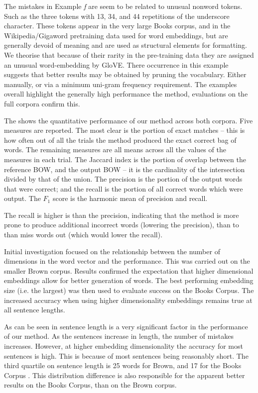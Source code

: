 \documentclass{llncs}
\begin{document}
The mistakes in Example \emph{f} are seem to be related to unusual nonword tokens. Such as the three tokens with 13, 34, and 44 repetitions of the underscore character. These tokens appear in the very large Books corpus, and in the Wikipedia/Gigaword pretraining data used for word embeddings, but are generally devoid of meaning and are used as structural elements for formatting. We theorise that because of their rarity in the pre-training data they are assigned an unusual word-embedding by GloVE. There occurrence in this example suggests that better results may be obtained by pruning the vocabulary. Either manually, or via a minimum uni-gram frequency requirement. The examples overall highlight the generally high performance the method, evaluations on the full corpora confirm this.

The  shows the quantitative performance of our method across both corpora. Five measures are reported. The most clear is the portion of exact matches -- this is how often out of all the trials the method produced the exact correct bag of words. The remaining measures are all means across all the values of the measures in each trial.  The Jaccard index is the portion of overlap between the reference BOW, and the output BOW -- it is the cardinality of the intersection divided by that of the union. The precision is the portion of the output words that were correct; and the recall is the portion of all correct words which were output. The $F_1$ score is the harmonic mean of precision and recall.

The recall is higher is than the precision, indicating that the method is more prone to produce additional incorrect words (lowering the precision), than to than miss words out (which would lower the recall). 

Initial investigation focused on the relationship between the number of dimensions in the word vector and the performance. This was carried out on the smaller Brown corpus. Results confirmed the expectation that higher dimensional embeddings allow for better generation of words. The best performing embedding size (i.e. the largest)  was then used to evaluate success on the Books Corpus. The increased accuracy when using higher dimensionality embeddings remains true at all sentence lengths.

As can be seen in  sentence length is a very significant factor in the performance of our method. As the sentences increase in length, the number of mistakes increases. However, at higher embedding dimensionality the accuracy for most sentences is high. This is because of most sentences being reasonably short. The third quartile on sentence length is 25 words for Brown, and 17 for the Books Corpus . This distribution difference is also responsible for the apparent better results on the Books Corpus, than on the Brown corpus.
\end{document}
